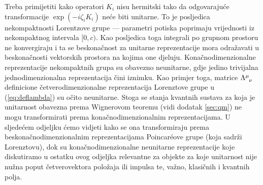 Treba primijetiti kako operatori $K_i$ nisu hermitski tako da odgovarajuće
transformacije $\exp(-i\zeta_i K_i)$ neće biti unitarne. To je posljedica
nekompaktnosti Lorentzove grupe --- parametri potiska poprimaju
vrijednosti iz nekompaktnog intervala $[0,c)$.
Kao posljedica toga integrali po grupnom prostoru ne konvergiraju i ta se beskonačnost
za unitarne reprezentacije mora odražavati u beskonačnosti vektorskih prostora
na kojima one djeluju. Konačnodimenzionalne reprezentacije nekompaktnih grupa
su obavezno neunitarne, gdje jedino trivijalna jednodimenzionalna reprezentacija
čini iznimku. Kao primjer toga, matrice $\tensor{\Lambda}{^\mu_\nu}$
definicione četverodimenzionalne reprezentacija Lorenztove grupe u (\ref{eq:deflambda}) 
su očito neunitarne. Stoga se stanja kvantnih sustava za koja je 
unitarnost obavezna prema Wignerovom teoremu (vidi dodatak \ref{sec:qm}) ne mogu transformirati
prema konačnodimenzionalnim reprezentacijama. U sljedećem odjeljku ćemo
vidjeti kako se ona transformiraju prema beskonačnodimenzionalnim
reprezentacijama Poincar\'{e}ove grupe (koja sadrži Lorenztovu),
dok su konačnodimenzionalne neunitarne reprezentacije koje diskutiramo
u ostatku ovog odjeljka relevantne za objekte za koje unitarnost
nije nužna poput četverovektora položaja ili impulsa te, važno, klasičnih
i kvantnih polja.


